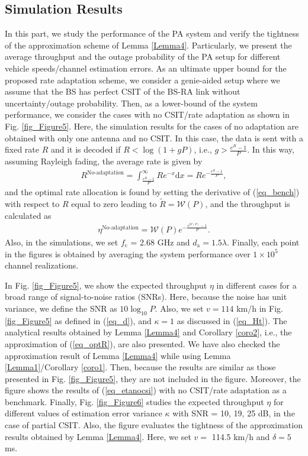\subsection{Simulation Results}
In this part, we study the performance of the PA system and verify the tightness of the approximation scheme of Lemma \ref{Lemma4}. Particularly, we present the average throughput and the outage probability of the PA setup for different vehicle speeds/channel estimation errors. As an ultimate upper bound for the proposed rate adaptation scheme, we consider a genie-aided setup where we assume that the BS has perfect CSIT of the BS-RA link without uncertainty/outage probability. Then, as a lower-bound of the system performance, we consider the cases with no CSIT/rate adaptation as shown in Fig. \ref{fig_Figure5}. Here, the simulation results for the cases of no adaptation are obtained with only one antenna and no CSIT. In this case,  the data is sent with a fixed rate $R$ and it is decoded if $R<\log(1+gP)$, i.e., $g>\frac{e^{R}-1}{P}$. In this way, assuming Rayleigh fading, the average rate is given by
\begin{align}\label{eq_bench}
    R^{\text{No-adaptation}} = \int_{\frac{e^{R}-1}{P}}^{\infty} Re^{-x} \text{d}x = Re^{-\frac{e^{R}-1}{P}},
\end{align}
and the optimal rate allocation is found by setting the derivative of (\ref{eq_bench}) with respect to $R$ equal to zero leading to $\tilde{R} = \mathcal{W}(P)$, and the throughput is calculated as 
\begin{align}\label{eq_etanocsi}
  \eta^{\text{No-adaptation}} =\mathcal{W}(P)e^{-\frac{e^{\mathcal{W}(P)}-1}{P}}.  
\end{align}
Also, in the simulations, we set  $f_\text{c}$ = 2.68 GHz and $d_\text{a} = 1.5\lambda$. Finally, each point in the figures is obtained by averaging the system performance over $1\times10^5$ channel realizations.




In Fig. \ref{fig_Figure5}, we show the expected throughput $\eta$  in different cases for a broad range of signal-to-noise ratios (SNRs). Here, because the noise has unit variance, we define the SNR as $10\log_{10}P$. Also, we set $v = 114$ km/h in Fig. \ref{fig_Figure5}  as defined in (\ref{eq_d}), and $\kappa = 1$ as discussed in (\ref{eq_Ht}). The analytical results obtained by Lemma \ref{Lemma4} and Corollary \ref{coro2}, i.e., the approximation of (\ref{eq_optR}), are also presented. We have also checked the approximation result of Lemma \ref{Lemma4} while using Lemma \ref{Lemma1}/Corollary \ref{coro1}. Then, because the results are similar as those presented in Fig. \ref{fig_Figure5}, they are not included in the figure. Moreover, the figure shows the results of (\ref{eq_etanocsi}) with no CSIT/rate adaptation as a benchmark. Finally, Fig. \ref{fig_Figure6} studies the expected throughput $\eta$ for different values of estimation error variance $\kappa$ with SNR = 10, 19, 25 dB, in the case of partial CSIT. Also, the figure evaluates the tightness of the approximation results obtained by Lemma \ref{Lemma4}. Here,  we set $v =$ 114.5 km/h and $\delta = 5$ ms.

